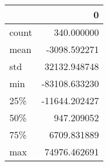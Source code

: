 \begin{tabular}{lr}
\toprule
{} &             0 \\
\midrule
count &    340.000000 \\
mean  &  -3098.592271 \\
std   &  32132.948748 \\
min   & -83108.633230 \\
25\%   & -11644.202427 \\
50\%   &    947.209052 \\
75\%   &   6709.831889 \\
max   &  74976.462691 \\
\bottomrule
\end{tabular}
